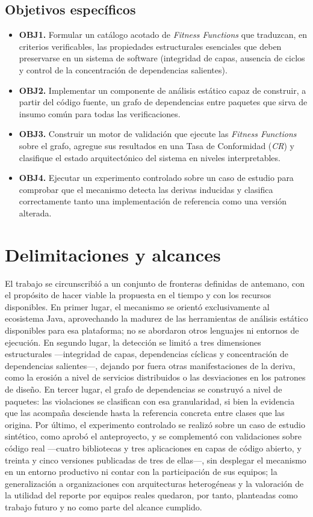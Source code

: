 \subsection{Objetivos específicos}
\begin{itemize}
    \item \textbf{OBJ1.} Formular un catálogo acotado de \textit{Fitness Functions} que traduzcan, en criterios verificables, las propiedades estructurales esenciales que deben preservarse en un sistema de software (integridad de capas, ausencia de ciclos y control de la concentración de dependencias salientes).
    \item \textbf{OBJ2.} Implementar un componente de análisis estático capaz de construir, a partir del código fuente, un grafo de dependencias entre paquetes que sirva de insumo común para todas las verificaciones.
    \item \textbf{OBJ3.} Construir un motor de validación que ejecute las \textit{Fitness Functions} sobre el grafo, agregue sus resultados en una Tasa de Conformidad (\textit{CR}) y clasifique el estado arquitectónico del sistema en niveles interpretables.
    \item \textbf{OBJ4.} Ejecutar un experimento controlado sobre un caso de estudio para comprobar que el mecanismo detecta las derivas inducidas y clasifica correctamente tanto una implementación de referencia como una versión alterada.
\end{itemize}

\section{Delimitaciones y alcances}
El trabajo se circunscribió a un conjunto de fronteras definidas de antemano, con el propósito de hacer viable la propuesta en el tiempo y con los recursos disponibles. En primer lugar, el mecanismo se orientó exclusivamente al ecosistema Java, aprovechando la madurez de las herramientas de análisis estático disponibles para esa plataforma; no se abordaron otros lenguajes ni entornos de ejecución. En segundo lugar, la detección se limitó a tres dimensiones estructurales —integridad de capas, dependencias cíclicas y concentración de dependencias salientes—, dejando por fuera otras manifestaciones de la deriva, como la erosión a nivel de servicios distribuidos o las desviaciones en los patrones de diseño. En tercer lugar, el grafo de dependencias se construyó a nivel de paquetes: las violaciones se clasifican con esa granularidad, si bien la evidencia que las acompaña desciende hasta la referencia concreta entre clases que las origina. Por último, el experimento controlado se realizó sobre un caso de estudio sintético, como aprobó el anteproyecto, y se complementó con validaciones sobre código real ---cuatro bibliotecas y tres aplicaciones en capas de código abierto, y treinta y cinco versiones publicadas de tres de ellas---, sin desplegar el mecanismo en un entorno productivo ni contar con la participación de sus equipos; la generalización a organizaciones con arquitecturas heterogéneas y la valoración de la utilidad del reporte por equipos reales quedaron, por tanto, planteadas como trabajo futuro y no como parte del alcance cumplido.


